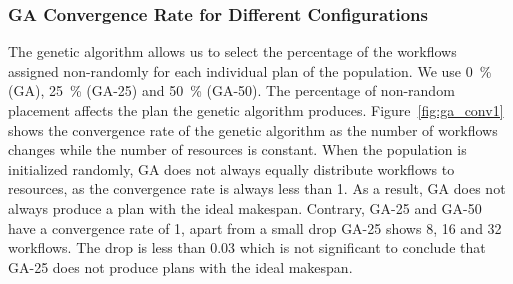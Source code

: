 \subsubsection*{GA Convergence Rate for Different Configurations}
The genetic algorithm allows us to select the percentage of the workflows assigned non-randomly for each individual plan of the population.
We use 0~\% (GA), 25~\% (GA-25) and 50~\% (GA-50).
The percentage of non-random placement affects the plan the genetic algorithm produces.
Figure~\ref{fig:ga_conv1} shows the convergence rate of the genetic algorithm as the number of workflows changes while the number of resources is constant.
When the population is initialized randomly, GA does not always equally distribute workflows to resources, as the convergence rate is always less than 1.
As a result, GA does not always produce a plan with the ideal makespan.
Contrary, GA-25 and GA-50 have a convergence rate of 1, apart from a small drop GA-25 shows 8, 16 and 32 workflows.
The drop is less than 0.03 which is not significant to conclude that GA-25 does not produce plans with the ideal makespan.

